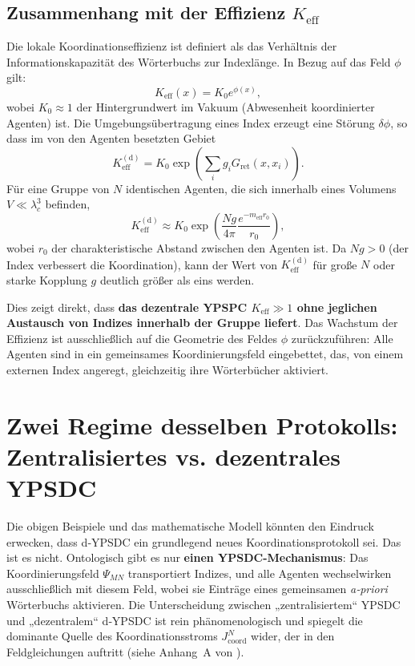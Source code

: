 \documentclass[12pt,a4paper]{article}
\begin{document}
	\subsection{Zusammenhang mit der Effizienz \(K_{\mathrm{eff}}\)}
	
	Die lokale Koordinationseffizienz ist definiert als das Verhältnis der Informationskapazität des Wörterbuchs zur Indexlänge. In Bezug auf das Feld \(\phi\) gilt:
	\begin{equation}
		K_{\mathrm{eff}}(x) = K_0 e^{\phi(x)},
		\label{eq:Keff-field}
	\end{equation}
	wobei \(K_0 \approx 1\) der Hintergrundwert im Vakuum (Abwesenheit koordinierter Agenten) ist. Die Umgebungsübertragung eines Index erzeugt eine Störung \(\delta\phi\), so dass im von den Agenten besetzten Gebiet
	\begin{equation}
		K_{\mathrm{eff}}^{\mathrm{(d)}} = K_0 \exp\!\left( \sum_i g_i G_{\mathrm{ret}}(x, x_i) \right).
	\end{equation}
	Für eine Gruppe von \(N\) identischen Agenten, die sich innerhalb eines Volumens \(V \ll \lambda_c^3\) befinden,
	\begin{equation}
		K_{\mathrm{eff}}^{\mathrm{(d)}} \approx K_0 \exp\!\left( \frac{N g}{4\pi} \frac{e^{-m_{\mathrm{eff}} r_0}}{r_0} \right),
	\end{equation}
	wobei \(r_0\) der charakteristische Abstand zwischen den Agenten ist. Da \(N g > 0\) (der Index verbessert die Koordination), kann der Wert von \(K_{\mathrm{eff}}^{\mathrm{(d)}}\) für große \(N\) oder starke Kopplung \(g\) deutlich größer als eins werden.
	
	Dies zeigt direkt, dass \textbf{das dezentrale YPSPC \(K_{\mathrm{eff}} \gg 1\) ohne jeglichen Austausch von Indizes innerhalb der Gruppe liefert}. Das Wachstum der Effizienz ist ausschließlich auf die Geometrie des Feldes \(\phi\) zurückzuführen: Alle Agenten sind in ein gemeinsames Koordinierungsfeld eingebettet, das, von einem externen Index angeregt, gleichzeitig ihre Wörterbücher aktiviert.
	
	\section{Zwei Regime desselben Protokolls: Zentralisiertes vs. dezentrales YPSDC}
	\label{sec:two-regimes}
	
	Die obigen Beispiele und das mathematische Modell könnten den Eindruck erwecken, dass d‑YPSDC ein grundlegend neues Koordinationsprotokoll sei. Das ist es nicht. Ontologisch gibt es nur \textbf{einen YPSDC-Mechanismus}: Das Koordinierungsfeld \(\Psi_{MN}\) transportiert Indizes, und alle Agenten wechselwirken ausschließlich mit diesem Feld, wobei sie Einträge eines gemeinsamen \emph{a‑priori} Wörterbuchs aktivieren. Die Unterscheidung zwischen „zentralisiertem“ YPSDC und „dezentralem“ d‑YPSDC ist rein phänomenologisch und spiegelt die dominante Quelle des Koordinationsstroms \(J^{N}_{\mathrm{coord}}\) wider, der in den Feldgleichungen auftritt (siehe Anhang~A von \cite{YUCT}).
	
\end{document}
